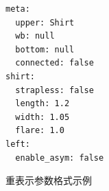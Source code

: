 \begin{figure}[b]
\centering
\begin{minipage}[t]{0.4\linewidth}
\begin{verbatim}
meta:
  upper: Shirt
  wb: null
  bottom: null
  connected: false
shirt:
  strapless: false
  length: 1.2        
  width: 1.05      
  flare: 1.0
left:
  enable_asym: false
\end{verbatim}
\end{minipage}
\caption{重表示参数格式示例}
\label{fig:ch4-repr-format}
\end{figure}
